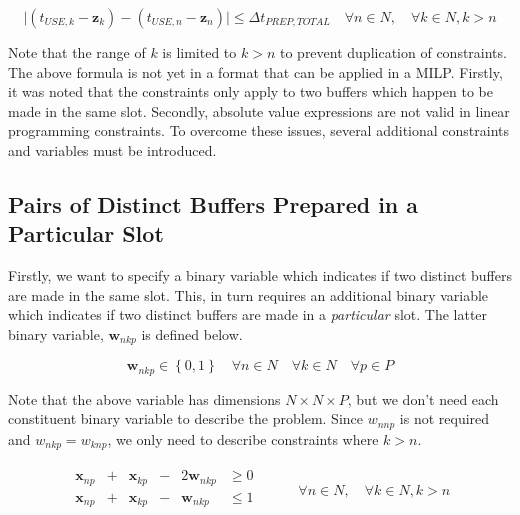 \begin{equation}
    \lvert \left( t_{USE,k} - \boldsymbol{z}_{k} \right) - \left( t_{USE,n} - 
    \boldsymbol{z}_{n} \right) \rvert \le \Delta t_{PREP,TOTAL} \quad \forall n 
    \in N, \quad \forall k \in N, k > n
\end{equation}

Note that the range of $ k $ is limited to $ k > n $ to prevent duplication
of constraints.
The above formula is not yet in a format that can be applied in a MILP.
Firstly, it was noted that the constraints only apply to two buffers which
happen to be made in the same slot.
Secondly, absolute value expressions are not valid in linear programming
constraints.
To overcome these issues, several additional constraints and variables must be
introduced.

\subsection{Pairs of Distinct Buffers Prepared in a Particular Slot}\label{SS.constr6}

Firstly, we want to specify a binary variable which indicates if two distinct
buffers are made in the same slot.  
This, in turn requires an additional binary variable which indicates if two
distinct buffers are made in a \emph{particular} slot.
The latter binary variable, $ \boldsymbol{w}_{nkp} $ is defined below.

\begin{equation}
    \boldsymbol{w}_{nkp} \in \left\{ 0, 1 \right\} \quad \forall n \in N \quad
    \forall k \in N \quad \forall p \in P
    \label{eq.w}
\end{equation}

Note that the above variable has dimensions $N \times N \times P$, but we don't
need each constituent binary variable to describe the problem.
Since $w_{nnp}$ is not required and $w_{nkp} = w_{knp}$, we only need to 
describe constraints where $k > n$.

\begin{equation}
    \begin{split}
        \begin{alignedat}{3}
            \boldsymbol{x}_{np} & {}+{} & \boldsymbol{x}_{kp} & {}-{} & 2 
            \boldsymbol{w}_{nkp} & \ge 0\\
            \boldsymbol{x}_{np} & {}+{} & \boldsymbol{x}_{kp} & {}-{} &
            \boldsymbol{w}_{nkp} & \le 1\\
        \end{alignedat}
    \end{split}
    \quad\quad
    \begin{split}
        \forall n \in N, \quad \forall k \in N, k > n
    \end{split}
    \label{eq.constr6}
\end{equation}

